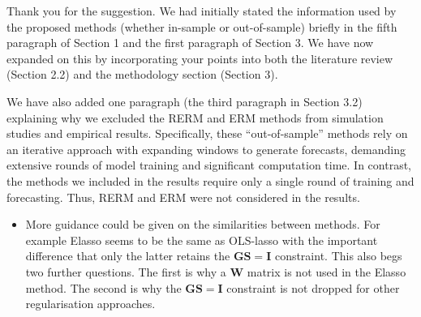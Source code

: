 \documentclass[11pt,a4paper,]{article}
\providecommand{\tightlist}{%
  \setlength{\itemsep}{0pt}\setlength{\parskip}{0pt}}
\renewenvironment{quote}
               {\list{}{\rightmargin\leftmargin}%
                \item\relax\color[RGB]{0,150,0}}
               {\endlist}
\begin{document}
\begin{quote}
Thank you for the suggestion. We had initially stated the information
used by the proposed methods (whether in-sample or out-of-sample)
briefly in the fifth paragraph of Section 1 and the first paragraph of
Section 3. We have now expanded on this by incorporating your points
into both the literature review (Section 2.2) and the methodology
section (Section 3).

We have also added one paragraph (the third paragraph in Section 3.2)
explaining why we excluded the RERM and ERM methods from simulation
studies and empirical results. Specifically, these ``out-of-sample''
methods rely on an iterative approach with expanding windows to generate
forecasts, demanding extensive rounds of model training and significant
computation time. In contrast, the methods we included in the results
require only a single round of training and forecasting. Thus, RERM and
ERM were not considered in the results.
\end{quote}

\begin{itemize}
\tightlist
\item
  More guidance could be given on the similarities between methods. For
  example Elasso seems to be the same as OLS-lasso with the important
  difference that only the latter retains the \(\bm{GS}=\bm{I}\)
  constraint. This also begs two further questions. The first is why a
  \(\bm{W}\) matrix is not used in the Elasso method. The second is why
  the \(\bm{GS}=\bm{I}\) constraint is not dropped for other
  regularisation approaches.
\end{itemize}
\end{document}
